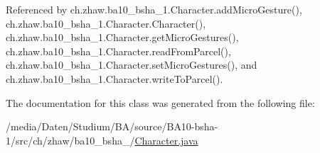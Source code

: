 Referenced by ch.zhaw.ba10\_\-bsha\_\-1.Character.addMicroGesture(), ch.zhaw.ba10\_\-bsha\_\-1.Character.Character(), ch.zhaw.ba10\_\-bsha\_\-1.Character.getMicroGestures(), ch.zhaw.ba10\_\-bsha\_\-1.Character.readFromParcel(), ch.zhaw.ba10\_\-bsha\_\-1.Character.setMicroGestures(), and ch.zhaw.ba10\_\-bsha\_\-1.Character.writeToParcel().

The documentation for this class was generated from the following file:\begin{DoxyCompactItemize}
\item 
/media/Daten/Studium/BA/source/BA10-\/bsha-\/1/src/ch/zhaw/ba10\_\-bsha\_/\hyperlink{Character_8java}{Character.java}\end{DoxyCompactItemize}
